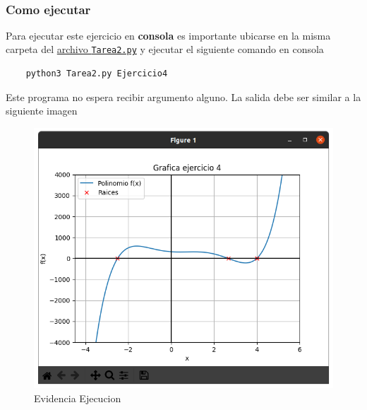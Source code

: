 \documentclass[11pt]{article}
\begin{document}
		\begin{center}
		\end{center}
		{ \hspace*{\fill} \\}		
		\hypertarget{como-ejecutar}{%
	\subsubsection{Como ejecutar}\label{como-ejecutar}}

	Para ejecutar este ejercicio en \textbf{consola} es importante ubicarse
	en la misma carpeta del
	\href{https://github.com/BenchHPZ/UG-Compu/blob/master/MN/Tareas/T2/Tarea2.py}{archivo
	\texttt{Tarea2.py}} y ejecutar el siguiente comando en consola

	\begin{verbatim}
	python3 Tarea2.py Ejercicio4
	\end{verbatim}

	Este programa no espera recibir argumento alguno. La salida debe ser
	similar a la siguiente imagen

	\begin{figure}
	\centering
	\includegraphics{assets/E4-1.png}
	\caption{Evidencia Ejecucion}
	\end{figure}
\end{document}
